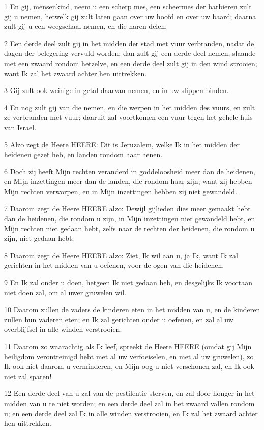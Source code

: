\par 1 En gij, mensenkind, neem u een scherp mes, een scheermes der barbieren zult gij u nemen, hetwelk gij zult laten gaan over uw hoofd en over uw baard; daarna zult gij u een weegschaal nemen, en die haren delen.
\par 2 Een derde deel zult gij in het midden der stad met vuur verbranden, nadat de dagen der belegering vervuld worden; dan zult gij een derde deel nemen, slaande met een zwaard rondom hetzelve, en een derde deel zult gij in den wind strooien; want Ik zal het zwaard achter hen uittrekken.
\par 3 Gij zult ook weinige in getal daarvan nemen, en in uw slippen binden.
\par 4 En nog zult gij van die nemen, en die werpen in het midden des vuurs, en zult ze verbranden met vuur; daaruit zal voortkomen een vuur tegen het gehele huis van Israel.
\par 5 Alzo zegt de Heere HEERE: Dit is Jeruzalem, welke Ik in het midden der heidenen gezet heb, en landen rondom haar henen.
\par 6 Doch zij heeft Mijn rechten veranderd in goddeloosheid meer dan de heidenen, en Mijn inzettingen meer dan de landen, die rondom haar zijn; want zij hebben Mijn rechten verworpen, en in Mijn inzettingen hebben zij niet gewandeld.
\par 7 Daarom zegt de Heere HEERE alzo: Dewijl gijlieden dies meer gemaakt hebt dan de heidenen, die rondom u zijn, in Mijn inzettingen niet gewandeld hebt, en Mijn rechten niet gedaan hebt, zelfs naar de rechten der heidenen, die rondom u zijn, niet gedaan hebt;
\par 8 Daarom zegt de Heere HEERE alzo: Ziet, Ik wil aan u, ja Ik, want Ik zal gerichten in het midden van u oefenen, voor de ogen van die heidenen.
\par 9 En Ik zal onder u doen, hetgeen Ik niet gedaan heb, en desgelijks Ik voortaan niet doen zal, om al uwer gruwelen wil.
\par 10 Daarom zullen de vaders de kinderen eten in het midden van u, en de kinderen zullen hun vaderen eten; en Ik zal gerichten onder u oefenen, en zal al uw overblijfsel in alle winden verstrooien.
\par 11 Daarom zo waarachtig als Ik leef, spreekt de Heere HEERE (omdat gij Mijn heiligdom verontreinigd hebt met al uw verfoeiselen, en met al uw gruwelen), zo Ik ook niet daarom u verminderen, en Mijn oog u niet verschonen zal, en Ik ook niet zal sparen!
\par 12 Een derde deel van u zal van de pestilentie sterven, en zal door honger in het midden van u te niet worden; en een derde deel zal in het zwaard vallen rondom u; en een derde deel zal Ik in alle winden verstrooien, en Ik zal het zwaard achter hen uittrekken.
